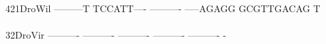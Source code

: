 \documentclass[11pt,twoside,reqno,a4paper]{article}
\begin{document}
{\hspace*{4\charwidth}\hspace*{7\charwidth}\hspace*{1\charwidth}\hspace*{1\charwidth}\hspace*{1\charwidth}\hspace*{1\charwidth}\hspace*{1\charwidth}\\
421\hspace*{1\charwidth}DroWil	---------T	TCCATT----	----------	-----AGAGG	GCGTTGACAG	T\\
\hspace*{4\charwidth}\hspace*{7\charwidth}\hspace*{1\charwidth}\hspace*{1\charwidth}\hspace*{1\charwidth}\hspace*{1\charwidth}\hspace*{1\charwidth}\\
32\hspace*{2\charwidth}DroVir	----------	----------	----------	----------	----------	-\\
\hspace*{4\charwidth}\hspace*{7\charwidth}\hspace*{1\charwidth}\hspace*{1\charwidth}\hspace*{1\charwidth}\hspace*{1\charwidth}\hspace*{1\charwidth}\\
\\
}
\end{document}
